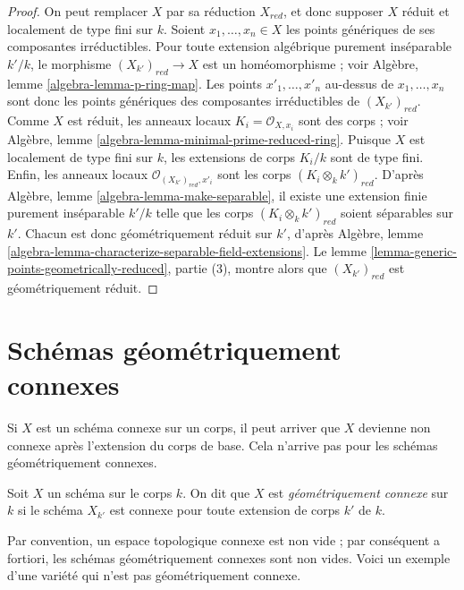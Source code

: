 \begin{proof}
On peut remplacer $X$ par sa réduction $X_{red}$, et donc
supposer $X$ réduit et localement de type fini sur $k$. Soient
$x_1, \ldots, x_n \in X$ les points génériques de ses composantes
irréductibles. Pour toute extension algébrique purement
inséparable $k'/k$, le morphisme
$(X_{k'})_{red} \to X$ est un
homéomorphisme ; voir Algèbre, lemme
\ref{algebra-lemma-p-ring-map}. Les points $x'_1, \ldots, x'_n$
au-dessus de $x_1, \ldots, x_n$ sont donc les points génériques
des composantes irréductibles de $(X_{k'})_{red}$. Comme $X$ est
réduit, les anneaux locaux $K_i = \mathcal{O}_{X, x_i}$ sont des
corps ; voir Algèbre, lemme
\ref{algebra-lemma-minimal-prime-reduced-ring}. Puisque $X$ est
localement de type fini sur $k$, les extensions de corps $K_i/k$
sont de type fini. Enfin, les anneaux locaux
$\mathcal{O}_{(X_{k'})_{red}, x'_i}$ sont les corps
$(K_i \otimes_k k')_{red}$. D'après Algèbre, lemme
\ref{algebra-lemma-make-separable}, il existe une extension finie
purement inséparable $k'/k$ telle que les corps
$(K_i \otimes_k k')_{red}$ soient séparables sur $k'$. Chacun est
donc géométriquement réduit sur $k'$, d'après
Algèbre, lemme
\ref{algebra-lemma-characterize-separable-field-extensions}.
Le lemme \ref{lemma-generic-points-geometrically-reduced}, partie (3),
montre alors que $(X_{k'})_{red}$ est géométriquement réduit.
\end{proof}







\section{Schémas géométriquement connexes}
\label{section-geometrically-connected}

\noindent
Si $X$ est un schéma connexe sur un corps, il peut arriver
que $X$ devienne non connexe après l'extension du corps de
base. Cela n'arrive pas pour les schémas géométriquement connexes.

\begin{definition}
\label{definition-geometrically-connected}
Soit $X$ un schéma sur le corps $k$. On dit que
$X$ est {\it géométriquement connexe} sur $k$ si le schéma
$X_{k'}$ est connexe pour toute extension de corps $k'$ de $k$.
\end{definition}

\noindent
Par convention, un espace topologique connexe est non vide ; par
conséquent a fortiori, les schémas géométriquement connexes sont non
vides. Voici un exemple d'une variété qui n'est pas géométriquement connexe.

